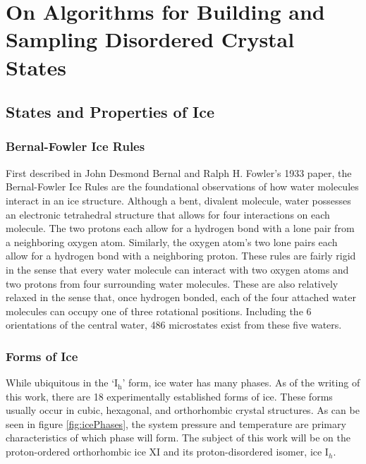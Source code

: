 \chapter{On Algorithms for Building and Sampling Disordered Crystal States}
\label{ch:iceXI}

\section{States and Properties of Ice}


\subsection{Bernal-Fowler Ice Rules}

First described in John Desmond Bernal and Ralph H. Fowler's 1933 paper, the Bernal-Fowler Ice Rules are the foundational observations of how water molecules interact in an ice structure.
Although a bent, divalent molecule, water possesses an electronic tetrahedral structure that allows for four interactions on each molecule.
The two protons each allow for a hydrogen bond with a lone pair from a neighboring oxygen atom.
Similarly, the oxygen atom's two lone pairs each allow for a hydrogen bond with a neighboring proton. 
These rules are fairly rigid in the sense that every water molecule can interact with two oxygen atoms and two protons from four surrounding water molecules.
These are also relatively relaxed in the sense that, once hydrogen bonded, each of the four attached water molecules can occupy one of three rotational positions. 
Including the 6 orientations of the central water, 486 microstates exist from these five waters.

\subsection{Forms of Ice}

While ubiquitous in the `I$_{\mathrm{h}}$' form, ice water has many phases.
As of the writing of this work, there are 18 experimentally established forms of ice. 
These forms usually occur in cubic, hexagonal, and orthorhombic crystal structures.
As can be seen in figure \ref{fig:icePhases}, the system pressure and temperature are primary characteristics of which phase will form.
The subject of this work will be on the proton-ordered orthorhombic ice XI and its proton-disordered isomer, ice I$_{h}$.

